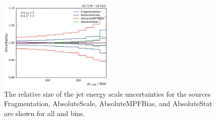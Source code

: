 \begin{figure}[htbp]
    \includegraphics[width=0.49\textwidth]{figures/measurement/jec_relunc_0_yb2ys0.pdf}
    \caption[Split-up of JEC sources: Part I]{The relative size of the jet energy scale
             uncertainties for the sources Fragmentation, AbsoluteScale,
             AbsoluteMPFBias,
             and AbsoluteStat are shown for all \ystar and \yboost bins.}
\label{fig:jec_relunc_0}
\end{figure}

